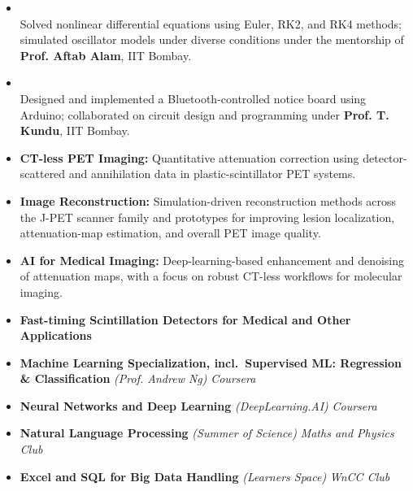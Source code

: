 \noindent {}
\begin{itemize}

\item {}\\
Solved nonlinear differential equations using Euler, RK2, and RK4 methods; simulated oscillator models under diverse conditions under the mentorship of \textbf{Prof. Aftab Alam}, IIT Bombay.

\item {}\\
Designed and implemented a Bluetooth-controlled notice board using Arduino; collaborated on circuit design and programming under \textbf{Prof. T. Kundu}, IIT Bombay.

\end{itemize}

\noindent {}
\begin{itemize}

\item \textbf{CT-less PET Imaging:} Quantitative attenuation correction using detector-scattered and annihilation data in plastic-scintillator PET systems.

\item \textbf{Image Reconstruction:} Simulation-driven reconstruction methods across the J-PET scanner family and prototypes for improving lesion localization, attenuation-map estimation, and overall PET image quality.

\item \textbf{AI for Medical Imaging:} Deep-learning-based enhancement and denoising of attenuation maps, with a focus on robust CT-less workflows for molecular imaging.

\end{itemize}

\noindent {}
\begin{itemize}

\item \textbf{Fast-timing Scintillation Detectors for Medical and Other Applications}

\item \textbf{Machine Learning Specialization, incl.\ Supervised ML: Regression \& Classification} \emph{(Prof. Andrew Ng)} \hfill \emph{Coursera}

\item \textbf{Neural Networks and Deep Learning} \emph{(DeepLearning.AI)} \hfill \emph{Coursera}

\item \textbf{Natural Language Processing} \emph{(Summer of Science)} \hfill \emph{Maths and Physics Club}

\item \textbf{Excel and SQL for Big Data Handling} \emph{(Learners Space)} \hfill \emph{WnCC Club}

\end{itemize}